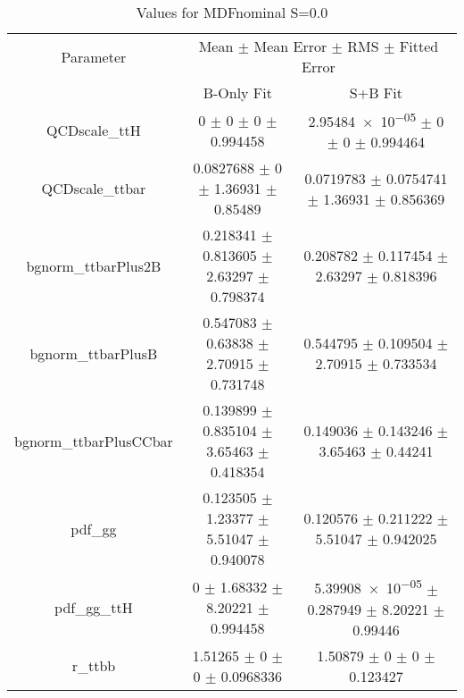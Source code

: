 \begin{table}
\centering
\caption{Values for MDFnominal S=0.0}
\begin{tabular}{ccc}
\toprule
Parameter & \multicolumn{2}{c}{Mean $\pm$ Mean Error $\pm$ RMS $\pm$ Fitted Error}\\
 & B-Only Fit & S+B Fit\\
\midrule
QCDscale\_ttH & \num{0} $\pm$ \num{0} $\pm$ \num{0} $\pm$ \num{0.994458} & \num{2.95484e-05} $\pm$ \num{0} $\pm$ \num{0} $\pm$ \num{0.994464}\\
QCDscale\_ttbar & \num{0.0827688} $\pm$ \num{0} $\pm$ \num{1.36931} $\pm$ \num{0.85489} & \num{0.0719783} $\pm$ \num{0.0754741} $\pm$ \num{1.36931} $\pm$ \num{0.856369}\\
bgnorm\_ttbarPlus2B & \num{0.218341} $\pm$ \num{0.813605} $\pm$ \num{2.63297} $\pm$ \num{0.798374} & \num{0.208782} $\pm$ \num{0.117454} $\pm$ \num{2.63297} $\pm$ \num{0.818396}\\
bgnorm\_ttbarPlusB & \num{0.547083} $\pm$ \num{0.63838} $\pm$ \num{2.70915} $\pm$ \num{0.731748} & \num{0.544795} $\pm$ \num{0.109504} $\pm$ \num{2.70915} $\pm$ \num{0.733534}\\
bgnorm\_ttbarPlusCCbar & \num{0.139899} $\pm$ \num{0.835104} $\pm$ \num{3.65463} $\pm$ \num{0.418354} & \num{0.149036} $\pm$ \num{0.143246} $\pm$ \num{3.65463} $\pm$ \num{0.44241}\\
pdf\_gg & \num{0.123505} $\pm$ \num{1.23377} $\pm$ \num{5.51047} $\pm$ \num{0.940078} & \num{0.120576} $\pm$ \num{0.211222} $\pm$ \num{5.51047} $\pm$ \num{0.942025}\\
pdf\_gg\_ttH & \num{0} $\pm$ \num{1.68332} $\pm$ \num{8.20221} $\pm$ \num{0.994458} & \num{5.39908e-05} $\pm$ \num{0.287949} $\pm$ \num{8.20221} $\pm$ \num{0.99446}\\
r\_ttbb & \num{1.51265} $\pm$ \num{0} $\pm$ \num{0} $\pm$ \num{0.0968336} & \num{1.50879} $\pm$ \num{0} $\pm$ \num{0} $\pm$ \num{0.123427}\\
\bottomrule
\end{tabular}
\end{table}